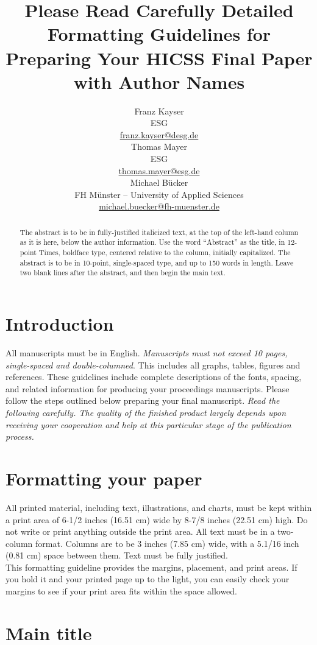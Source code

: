 \documentclass[10pt]{article}
\title{Please Read Carefully Detailed Formatting Guidelines for Preparing Your HICSS Final Paper with Author Names}
\author{Franz Kayser \\
  ESG \\
  {\underline{ franz.kayser@desg.de}} \\\And
  Thomas Mayer \\
  ESG  \\
  {\underline{ thomas.mayer@esg.de} }\\\And 
  Michael Bücker \\
  FH Münster -- University of Applied Sciences\\
  {\underline{michael.buecker@fh-muenster.de}} \\}
\date{}
\begin{document}
\maketitle
\begin{abstract}
    The abstract is to be in fully-justified italicized text, at the top of the left-hand column as it is here, below the author information. Use the word “Abstract” as the title, in 12-point Times, boldface type, centered relative to the column, initially capitalized. The abstract is to be in 10-point, single-spaced type, and up to 150 words in length. Leave two blank lines after the abstract, and then begin the main text.

\end{abstract}

\section{Introduction}

All manuscripts must be in English. {\em Manuscripts must  not exceed 10 pages, single-spaced and double-columned}.  This includes all graphs, tables, figures and references. These guidelines include complete descriptions of the fonts, spacing, and related information for producing your proceedings manuscripts. Please follow the steps outlined below preparing your final manuscript. {\em Read the following carefully. The quality of the finished product largely depends upon receiving your cooperation and help at this particular stage of the publication process.}


\section{Formatting your paper}

All printed material, including text, illustrations, and charts, must be kept within a print area of 6-1/2 inches (16.51 cm) wide by 8-7/8 inches (22.51 cm) high. Do not write or print anything outside the print area. All text must be in a two-column format. Columns are to be 3 inches (7.85 cm) wide, with a 5.1/16 inch (0.81 cm) space between them. Text must be fully justified. \\
This formatting guideline provides the margins, placement, and print areas. If you hold it and your printed page up to the light, you can easily check your margins to see if your print area fits within the space allowed.

\section{Main title}
\end{document}
